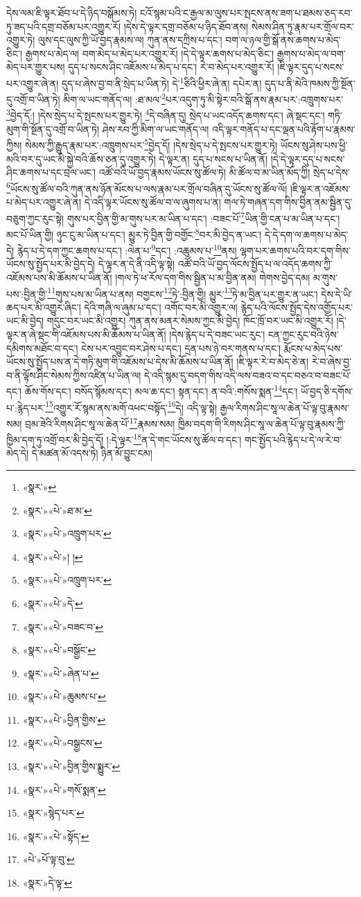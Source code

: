 དེས་ལམ་ཇི་ལྟར་ཐོབ་པ་དེ་ཉིད་བསྒོམས་ཏེ། ངའོ་སྙམ་པའི་ང་རྒྱལ་མ་ལུས་པར་སྤངས་ནས་ཟག་པ་ཐམས་ཅད་རབ་ཏུ་ཟད་པའི་དགྲ་བཅོམ་པར་འགྱུར་རོ། །དེས་དེ་ལྟར་དགྲ་བཅོམ་པ་ཉིད་ཐོབ་ནས། སེམས་ཤིན་ཏུ་རྣམ་པར་གྲོལ་བར་འགྱུར་ཏེ། ལུས་དང་ལུས་ཀྱི་ཡོ་བྱད་རྣམས་ལ། ཀུན་ནས་དཀྲིས་པ་དང་། བག་ལ་ཉལ་གྱི་སྒོ་ནས་ཆགས་པ་མེད་ཅིང་། རྒྱགས་པ་མེད་ལ། བག་མེད་པ་མེད་པར་འགྱུར་རོ། །དེ་དེ་ལྟར་ཆགས་པ་མེད་ཅིང་། རྒྱགས་པ་མེད་ལ་བག་མེད་པར་གྱུར་པས། དུད་པ་སངས་ཤིང་འཇོམས་པ་མེད་པ་དང་། རེ་བ་མེད་པར་འགྱུར་རོ། །ཇི་ལྟར་དུད་པ་སངས་པར་འགྱུར་ཞེ་ན། དུད་པ་ཞེས་བྱ་བ་ནི་སྲེད་པ་ཡིན་ཏེ། དེ་\footnote{«སྣར་»}ཅིའི་ཕྱིར་ཞེ་ན། དཔེར་ན། དུད་པ་ནི་མེའི་ཁམས་ཀྱི་སྔོན་དུ་འགྲོ་བ་ཡིན་ཏེ། མིག་ལ་ཡང་གནོད་ལ། :ཐ་མལ་\footnote{«སྣར་»«པེ་»ཐ་མ་}པར་འདུག་ཏུ་མི་སྟེར་བའི་སྒོ་ནས་རྣམ་པར་:འཁྲུགས་པར་\footnote{«སྣར་»«པེ་»འཁྲུག་པར་}བྱེད་དོ:། །དེས་སྲེད་པ་དེ་སྤངས་པར་གྱུར་ཏེ། \footnote{«སྣར་»«པེ་»། ། }དེ་བཞིན་དུ། སྲེད་པ་ཡང་འདོད་ཆགས་དང་། ཞེ་སྡང་དང་། གཏི་མུག་གི་སྔོན་དུ་འགྲོ་བ་ཡིན་ཏེ། ཤེས་རབ་ཀྱི་མིག་ལ་ཡང་གནོད་ལ། འདི་ལྟར་གནོད་པ་དང་ལྡན་པའི་རྟོག་པ་རྣམས་ཀྱིས། སེམས་ཀྱི་རྒྱུད་རྣམ་པར་:འཁྲུགས་པར་\footnote{«སྣར་»«པེ་»འཁྲུག་པར་}བྱེད་དོ། །དེས་སྲེད་པ་དེ་སྤངས་པར་གྱུར་ཏེ། ཡོངས་སུ་ཤེས་པས་ཕྱི་མའི་བར་དུ་ཡང་མི་སྐྱེ་བའི་ཆོས་ཅན་དུ་འགྱུར་ཏེ། དེ་ལྟར་ན། དུད་པ་སངས་པ་ཡིན་ནོ། །དེ་དེ་ལྟར་དུད་པ་སངས་ཤིང་ཆགས་པ་དང་བྲལ་ཡང་། འཚོ་བའི་ཡོ་བྱད་རྣམས་ཡོངས་སུ་ཚོལ་ཏེ། མི་ཚོལ་བ་མ་ཡིན་མོད་ཀྱི། སྲེད་པ་དེས་\footnote{«སྣར་»«པེ་»དེ་}ཡོངས་སུ་ཚོལ་བའི་ཀུན་ནས་ཉོན་མོངས་པ་ལས་རྣམ་པར་གྲོལ་བཞིན་དུ་ཡོངས་སུ་ཚོལ་ལོ། །ཇི་ལྟར་ན་འཇོམས་པ་མེད་པར་འགྱུར་ཞེ་ན། དེ་འདི་ལྟར་ཡོངས་སུ་ཚོལ་བ་ལ་ཞུགས་པ་ན། གལ་ཏེ་གཞན་དག་གིས་བྱིན་ནམ་སྦྱིན་དུ་བཅུག་ཀྱང་རུང་སྟེ། གུས་པར་བྱིན་གྱི་མ་གུས་པར་མ་ཡིན་པ་དང་། :བཟང་པོ་\footnote{«སྣར་»«པེ་»བཟང་བ་}ཡིན་གྱི་ངན་པ་མ་ཡིན་པ་དང་། མང་པོ་ཡིན་གྱི། ཉུང་ངུ་མ་ཡིན་པ་དང་། མྱུར་ཏེ་བྱིན་གྱི་བགྱོང་\footnote{«སྣར་»«པེ་»བསྒྱོང་}བར་མི་བྱེད་ན་ཡང་། དེ་དེ་དག་ལ་ཆགས་པ་མེད་དེ། རྙེད་པ་དེ་དག་ཀྱང་ཆགས་པ་དང་། :ལེན་པ་\footnote{«སྣར་»«པེ་»ཞེན་པ་}དང་། :འཆུམས་པ་\footnote{«སྣར་»«པེ་»ཆུམས་པ་}ནས། ལྷག་པར་ཆགས་པའི་བར་དག་གིས་ཡོངས་སུ་སྤྱོད་པར་མི་བྱེད་དེ། དེ་ལྟར་ན་དེ་ནི་འདི་ལྟ་སྟེ། འཚོ་བའི་ཡོ་བྱད་ལོངས་སྤྱོད་པ་ལ་འདོད་ཆགས་ཀྱི་འཇོམས་པས་མི་ཆོམས་པ་ཡིན་ནོ། །གལ་ཏེ་ཕ་རོལ་དག་གིས་སྦྱིན་པ་མ་བྱིན་ནམ། གེགས་བྱེད་དམ། མ་གུས་པས་:བྱིན་གྱི་\footnote{«སྣར་»«པེ་»བྱིན་གྱིས་}གུས་པས་མ་ཡིན་པ་ནས། བགྱངས་\footnote{«སྣར་»«པེ་»བསྒྱངས་}ཏེ་:བྱིན་གྱི། མྱུར་\footnote{«སྣར་»«པེ་»བྱིན་གྱིས་སྨྱུར་}ཏེ་མ་བྱིན་པར་གྱུར་ན་ཡང་། དེས་དེ་ཡི་ཆད་པར་མི་འགྱུར་ཞིང་། དེའི་གཞི་ལ་ཞུམ་པ་དང་། འགོང་བར་མི་འགྱུར་ལ། རྙེད་པའི་ལོངས་སྤྱོད་དེས་འགྱོད་པར་ཡང་མི་བྱེད། གདུང་བར་ཡང་མི་འགྱུར། ཀུན་ནས་མནར་སེམས་ཀྱང་མི་བྱེད། ཁོང་ཁྲོ་བར་ཡང་མི་འགྱུར་རོ། །དེ་ལྟར་ན་ཞེ་སྡང་གི་འཇོམས་པས་མི་ཆོམས་པ་ཡིན་ནོ། །དེས་རྙེད་པ་དེ་བཟང་ཡང་རུང་། ངན་ཀྱང་རུང་བའི་ཉེས་དམིགས་མཐོང་བ་དང་། ངེས་པར་འབྱུང་བར་ཤེས་པ་དང་། དྲན་པས་ཉེ་བར་གནས་པ་དང་། རྨོངས་པ་མེད་པས་ཡོངས་སུ་སྤྱོད་པས་ན་དེ་གཏི་མུག་གི་འཇོམས་པ་དེས་མི་ཆོམས་པ་ཡིན་ནོ། །ཇི་ལྟར་རེ་བ་མེད་ཅེ་ན། རེ་བ་ཞེས་བྱ་བ་ནི་ལྟོས་ཤིང་སེམས་ཀྱིས་འཛིན་པ་ཡིན་ལ། དེ་འདི་སྙམ་དུ་བདག་གིས་འདི་ལས་བཟའ་བ་དང་བཅའ་བ་བཟང་པོ་དང་། ཆོས་གོས་དང་། བསོད་སྙོམས་དང་། མལ་ཆ་དང་། སྟན་དང་། ན་བའི་:གསོས་སྨན་\footnote{«སྣར་»«པེ་»གསོ་སྨན་}དང་། ཡོ་བྱད་ཅི་དགོས་པ་:རྙེད་པར་\footnote{«སྣར་»སྙེད་པར་}འགྱུར་རོ་སྙམ་ནས་མགོ་འཕང་བསྟོད་\footnote{«སྣར་»«པེ་»སྟོད་}དེ། འདི་ལྟ་སྟེ། རྒྱལ་རིགས་ཤིང་སཱ་ལ་ཆེན་པོ་ལྟ་བུ་རྣམས་སམ། བྲམ་ཟེའི་རིགས་ཤིང་སཱ་ལ་ཆེན་པོ་\footnote{«པེ་»པོ་ལྟ་བུ་}རྣམས་སམ། ཁྱིམ་བདག་གི་རིགས་ཤིང་སཱ་ལ་ཆེན་པོ་ལྟ་བུ་རྣམས་ཀྱི་ཁྱིམ་དག་ཏུ་འགྲོ་བར་མི་བྱེད་དོ། །:དེ་ལྟར་\footnote{«སྣར་»དེ་ལྟ་}ན་དེ་གང་ཡོངས་སུ་ཚོལ་བ་དང་། གང་སྤྱོད་པའི་རྙེད་པ་དེ་ལ་རེ་བ་མེད་དེ། དེ་མཚན་མོ་འདས་ཏེ། ཉིན་མོ་བྱུང་ངམ། 